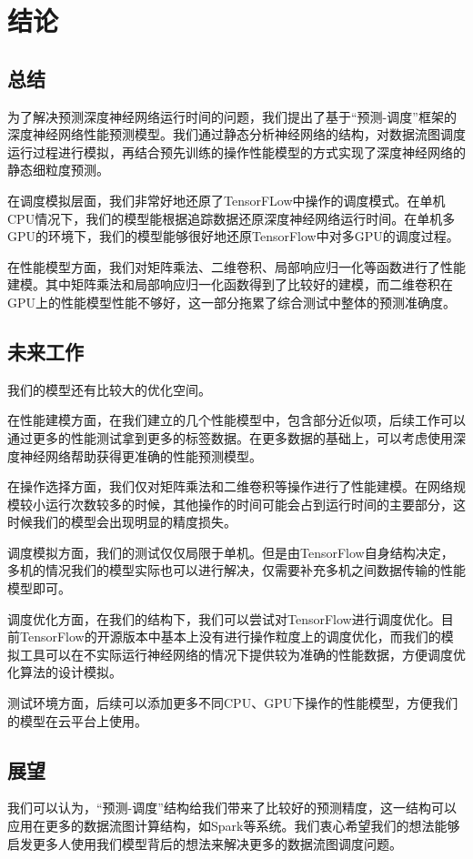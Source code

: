 \chapter{结论}
\section{总结}
\label{cha:conc}
    为了解决预测深度神经网络运行时间的问题，我们提出了基于“预测-调度”框架的深度神经网络性能预测模型。我们通过静态分析神经网络的结构，对数据流图调度运行过程进行模拟，再结合预先训练的操作性能模型的方式实现了深度神经网络的静态细粒度预测。
    
    在调度模拟层面，我们非常好地还原了TensorFLow中操作的调度模式。在单机CPU情况下，我们的模型能根据追踪数据还原深度神经网络运行时间。在单机多GPU的环境下，我们的模型能够很好地还原TensorFlow中对多GPU的调度过程。
    
    在性能模型方面，我们对矩阵乘法、二维卷积、局部响应归一化等函数进行了性能建模。其中矩阵乘法和局部响应归一化函数得到了比较好的建模，而二维卷积在GPU上的性能模型性能不够好，这一部分拖累了综合测试中整体的预测准确度。
    
\section{未来工作}
    我们的模型还有比较大的优化空间。
    
    在性能建模方面，在我们建立的几个性能模型中，包含部分近似项，后续工作可以通过更多的性能测试拿到更多的标签数据。在更多数据的基础上，可以考虑使用深度神经网络帮助获得更准确的性能预测模型。
    
    在操作选择方面，我们仅对矩阵乘法和二维卷积等操作进行了性能建模。在网络规模较小运行次数较多的时候，其他操作的时间可能会占到运行时间的主要部分，这时候我们的模型会出现明显的精度损失。
    
    调度模拟方面，我们的测试仅仅局限于单机。但是由TensorFlow自身结构决定，多机的情况我们的模型实际也可以进行解决，仅需要补充多机之间数据传输的性能模型即可。
    
    调度优化方面，在我们的结构下，我们可以尝试对TensorFlow进行调度优化。目前TensorFlow的开源版本中基本上没有进行操作粒度上的调度优化，而我们的模拟工具可以在不实际运行神经网络的情况下提供较为准确的性能数据，方便调度优化算法的设计模拟。
    
    测试环境方面，后续可以添加更多不同CPU、GPU下操作的性能模型，方便我们的模型在云平台上使用。
    
\section{展望}

    我们可以认为，“预测-调度”结构给我们带来了比较好的预测精度，这一结构可以应用在更多的数据流图计算结构，如Spark\cite{rdd}等系统。我们衷心希望我们的想法能够启发更多人使用我们模型背后的想法来解决更多的数据流图调度问题。
    
